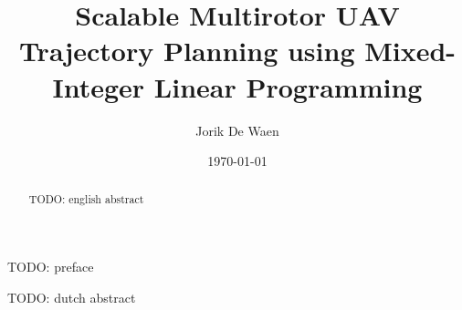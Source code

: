 \documentclass[
master=cws,
masteroption=ai,
english,
]{kulemt}
\title{Scalable Multirotor UAV Trajectory Planning using Mixed-Integer Linear Programming}
\author{Jorik De Waen}
\date{\today}
\begin{document}
\begin{preface}
TODO: preface
\end{preface}

\tableofcontents*

\begin{abstract}
TODO: english abstract
\end{abstract}

\begin{abstract*}
TODO: dutch abstract
\end{abstract*}

\listoffigures
\listoftables

\mainmatter

\clearpage

\clearpage

\clearpage

\clearpage

\clearpage

\clearpage
%

\clearpage

\backmatter



\end{document}
